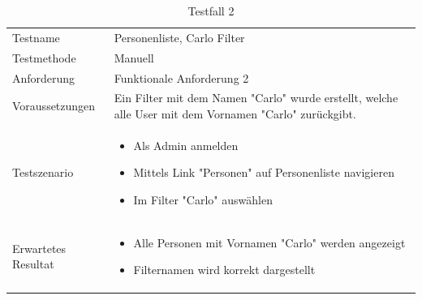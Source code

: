 \begin{table}[h!]
   \begin{tabular}{|L{0.4\textwidth}|L{0.6\textwidth}|}
       \hline
         \\[12pt]
       \hline
        Testname & Personenliste, Carlo Filter \\
       \hline
       Testmethode & Manuell \\
       \hline
        Anforderung & Funktionale Anforderung 2 \\
       \hline
       Voraussetzungen & Ein Filter mit dem Namen "Carlo" wurde erstellt, welche alle User mit dem 
       Vornamen "Carlo" zurückgibt. \\
       \hline
       Testszenario & 
       \begin{itemize}
         \item Als Admin anmelden
         \item Mittels Link "Personen" auf Personenliste navigieren
         \item Im Filter "Carlo" auswählen
       \end{itemize} \\
       \hline
       Erwartetes Resultat & 
       \begin{itemize}
         \item Alle Personen mit Vornamen "Carlo" werden angezeigt
         \item Filternamen wird korrekt dargestellt
      \end{itemize} \\
      \hline
     \end{tabular}
     \caption{Testfall 2}
\end{table}

\newpage


